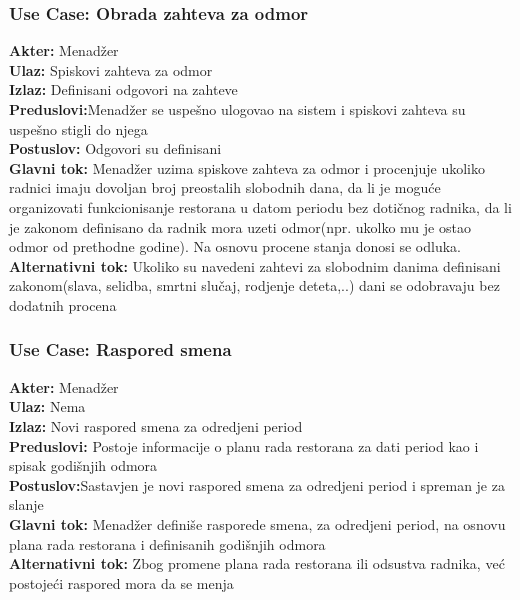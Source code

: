 \documentclass{article}
\begin{document}
\subsubsection{\textbf{Use Case}: Obrada zahteva za odmor}
\textbf{Akter:} Menadžer\\
\textbf{Ulaz:} Spiskovi zahteva za odmor\\
\textbf{Izlaz:} Definisani odgovori na zahteve\\
\textbf{Preduslovi:}Menadžer se uspešno ulogovao na sistem i spiskovi zahteva su uspešno stigli do njega\\
\textbf{Postuslov:} Odgovori su definisani\\
\textbf{Glavni tok:} Menadžer uzima spiskove zahteva za odmor i procenjuje ukoliko radnici imaju dovoljan broj preostalih slobodnih dana, da li je moguće organizovati funkcionisanje restorana u datom periodu bez dotičnog radnika, da li je zakonom definisano da radnik mora uzeti odmor(npr. ukolko mu je ostao odmor od prethodne godine). Na osnovu procene stanja donosi se odluka.
\textbf{Alternativni tok:} Ukoliko su navedeni zahtevi za slobodnim danima definisani zakonom(slava, selidba, smrtni slučaj, rodjenje deteta,..) dani se odobravaju bez dodatnih procena\\
\subsubsection{\textbf{Use Case}: Raspored smena}
\textbf{Akter:} Menadžer\\
\textbf{Ulaz:} Nema\\
\textbf{Izlaz:} Novi raspored smena za odredjeni period\\
\textbf{Preduslovi:} Postoje informacije o planu rada restorana za dati period kao i spisak godišnjih odmora\\
\textbf{Postuslov:}Sastavjen je novi raspored smena za odredjeni period i spreman je za slanje\\
\textbf{Glavni tok:} Menadžer definiše rasporede smena, za odredjeni period, na osnovu plana rada restorana i definisanih godišnjih odmora\\
\textbf{Alternativni tok:} Zbog promene plana rada restorana ili odsustva radnika, već postojeći raspored mora da se menja\\
\end{document}
